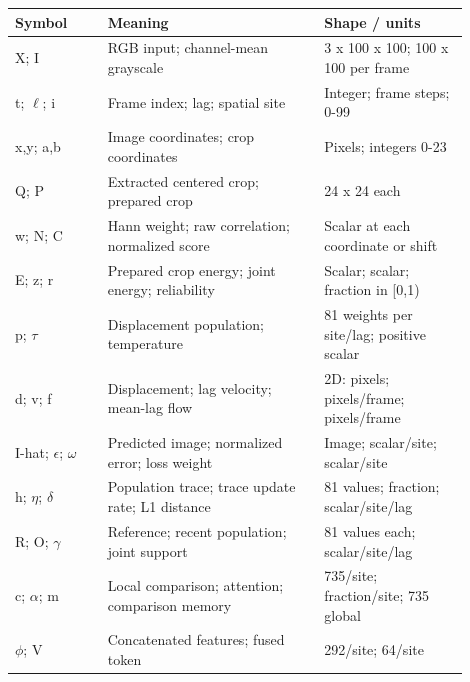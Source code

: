 \documentclass[11pt,letterpaper]{article}
\begin{document}
\begin{center}\small\renewcommand{\arraystretch}{1.16}\setlength{\tabcolsep}{4pt}\begin{tabular}{p{0.187\linewidth}p{0.428\linewidth}p{0.285\linewidth}}\toprule

\textbf{Symbol} & \textbf{Meaning} & \textbf{Shape /\allowbreak{} units} \\

\midrule

X; I & RGB input; channel-mean grayscale & 3 x 100 x 100; 100 x 100 per frame \\

t; \(\ell\); i & Frame index; lag; spatial site & Integer; frame steps; 0-99 \\

x,y; a,b & Image coordinates; crop coordinates & Pixels; integers 0-23 \\

Q; P & Extracted centered crop; prepared crop & 24 x 24 each \\

w; N; C & Hann weight; raw correlation; normalized score & Scalar at each coordinate or shift \\

E; z; r & Prepared crop energy; joint energy; reliability & Scalar; scalar; fraction in [0,1) \\

p; \(\tau\) & Displacement population; temperature & 81 weights per site/\allowbreak{}lag; positive scalar \\

d; v; f & Displacement; lag velocity; mean-lag flow & 2D: pixels; pixels/\allowbreak{}frame; pixels/\allowbreak{}frame \\

I-hat; \(\epsilon\); \(\omega\) & Predicted image; normalized error; loss weight & Image; scalar/\allowbreak{}site; scalar/\allowbreak{}site \\

h; \(\eta\); \(\delta\) & Population trace; trace update rate; L1 distance & 81 values; fraction; scalar/\allowbreak{}site/\allowbreak{}lag \\

R; O; \(\gamma\) & Reference; recent population; joint support & 81 values each; scalar/\allowbreak{}site/\allowbreak{}lag \\

c; \(\alpha\); m & Local comparison; attention; comparison memory & 735/\allowbreak{}site; fraction/\allowbreak{}site; 735 global \\

\(\phi\); V & Concatenated features; fused token & 292/\allowbreak{}site; 64/\allowbreak{}site \\

\bottomrule\end{tabular}\end{center}
\end{document}
